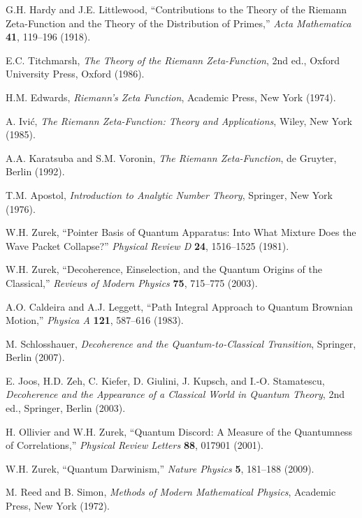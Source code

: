 \documentclass[11pt]{article}
\theoremstyle{plain}
\theoremstyle{definition}
\theoremstyle{remark}
\begin{document}
\begin{thebibliography}{99}
 G.H. Hardy and J.E. Littlewood, ``Contributions to the Theory of the Riemann Zeta-Function and the Theory of the Distribution of Primes,'' \emph{Acta Mathematica} \textbf{41}, 119--196 (1918).

 E.C. Titchmarsh, \emph{The Theory of the Riemann Zeta-Function}, 2nd ed., Oxford University Press, Oxford (1986).

 H.M. Edwards, \emph{Riemann's Zeta Function}, Academic Press, New York (1974).

 A. Ivić, \emph{The Riemann Zeta-Function: Theory and Applications}, Wiley, New York (1985).

 A.A. Karatsuba and S.M. Voronin, \emph{The Riemann Zeta-Function}, de Gruyter, Berlin (1992).

 T.M. Apostol, \emph{Introduction to Analytic Number Theory}, Springer, New York (1976).

 W.H. Zurek, ``Pointer Basis of Quantum Apparatus: Into What Mixture Does the Wave Packet Collapse?'' \emph{Physical Review D} \textbf{24}, 1516--1525 (1981).

 W.H. Zurek, ``Decoherence, Einselection, and the Quantum Origins of the Classical,'' \emph{Reviews of Modern Physics} \textbf{75}, 715--775 (2003).

 A.O. Caldeira and A.J. Leggett, ``Path Integral Approach to Quantum Brownian Motion,'' \emph{Physica A} \textbf{121}, 587--616 (1983).

 M. Schlosshauer, \emph{Decoherence and the Quantum-to-Classical Transition}, Springer, Berlin (2007).

 E. Joos, H.D. Zeh, C. Kiefer, D. Giulini, J. Kupsch, and I.-O. Stamatescu, \emph{Decoherence and the Appearance of a Classical World in Quantum Theory}, 2nd ed., Springer, Berlin (2003).

 H. Ollivier and W.H. Zurek, ``Quantum Discord: A Measure of the Quantumness of Correlations,'' \emph{Physical Review Letters} \textbf{88}, 017901 (2001).

 W.H. Zurek, ``Quantum Darwinism,'' \emph{Nature Physics} \textbf{5}, 181--188 (2009).

 M. Reed and B. Simon, \emph{Methods of Modern Mathematical Physics}, Academic Press, New York (1972).


\end{thebibliography}
\end{document}
